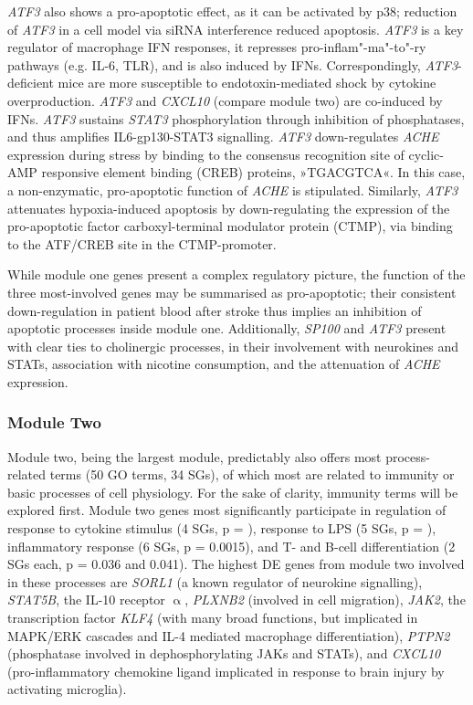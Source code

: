 \emph{ATF3} also shows a pro-apoptotic effect, as it can be activated by p38;\cite{Song2016} reduction of \emph{ATF3} in a cell model via siRNA interference reduced apoptosis.\cite{Sun2017} \emph{ATF3} is a key regulator of macrophage IFN responses, it represses pro-inflam"-ma"-to"-ry pathways (e.g. IL-6, TLR), and is also induced by IFNs. Correspondingly, \emph{ATF3}-deficient mice are more susceptible to endotoxin-mediated shock by cytokine overproduction. \emph{ATF3} and \emph{CXCL10} (compare module two) are co-induced by IFNs.\cite{Labzin2015} \emph{ATF3} sustains \emph{STAT3} phosphorylation through inhibition of phosphatases, and thus amplifies IL6-gp130-STAT3 signalling.\cite{Glal2018} \emph{ATF3} down-regulates \emph{ACHE} expression during stress by binding to the consensus recognition site of cyclic-AMP responsive element binding (CREB) proteins, »TGACGTCA«. In this case, a non-enzymatic, pro-apoptotic function of \emph{ACHE} is stipulated.\cite{Heinrich2018} Similarly, \emph{ATF3} attenuates hypoxia-induced apoptosis by down-regulating the expression of the pro-apoptotic factor carboxyl-terminal modulator protein (CTMP), via binding to the ATF/CREB site in the CTMP-promoter.\cite{Huang2015}

While module one genes present a complex regulatory picture, the function of the three most-involved genes may be summarised as pro-apoptotic; their consistent down-regulation in patient blood after stroke thus implies an inhibition of apoptotic processes inside module one. Additionally, \emph{SP100} and \emph{ATF3} present with clear ties to cholinergic processes, in their involvement with neurokines and STATs, association with nicotine consumption, and the attenuation of \emph{ACHE} expression. 

\subsubsection{Module Two}
Module two, being the largest module, predictably also offers most process-related terms (50 GO terms, 34 SGs), of which most are related to immunity or basic processes of cell physiology. For the sake of clarity, immunity terms will be explored first. Module two genes most significantly participate in regulation of response to cytokine stimulus (4 SGs, p = ), response to LPS (5 SGs, p = ), inflammatory response (6 SGs, p = 0.0015), and T- and B-cell differentiation (2 SGs each, p = 0.036 and 0.041). The highest DE genes from module two involved in these processes are \emph{SORL1} (a known regulator of neurokine signalling), \emph{STAT5B}, the IL-10 receptor $\upalpha$, \emph{PLXNB2} (involved in cell migration),  \emph{JAK2}, the transcription factor \emph{KLF4} (with many broad functions, but implicated in MAPK/ERK cascades and IL-4 mediated macrophage differentiation\cite{Ghaleb2017}), \emph{PTPN2} (phosphatase involved in dephosphorylating JAKs and STATs), and \emph{CXCL10} (pro-inflammatory chemokine ligand implicated in response to brain injury by activating microglia).
 
